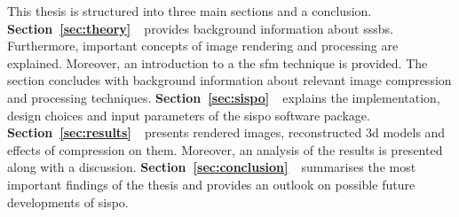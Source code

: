 This thesis is structured into three main sections and a conclusion. \newline \textbf{Section~\ref{sec:theory}~}~provides background information about \glspl{sssb}. Furthermore, important concepts of image rendering and processing are explained. Moreover, an introduction to a the \gls{sfm} technique is provided. The section concludes with background information about relevant image compression and processing techniques. \textbf{Section~\ref{sec:sispo}~}~explains the implementation, design choices and input parameters of the \gls{sispo} software package. \textbf{Section~\ref{sec:results}~}~presents rendered images, reconstructed \gls{3d} models and effects of compression on them. Moreover, an analysis of the results is presented along with a discussion. \textbf{Section~\ref{sec:conclusion}~}~summarises the most important findings of the thesis and provides an outlook on possible future developments of \gls{sispo}.


